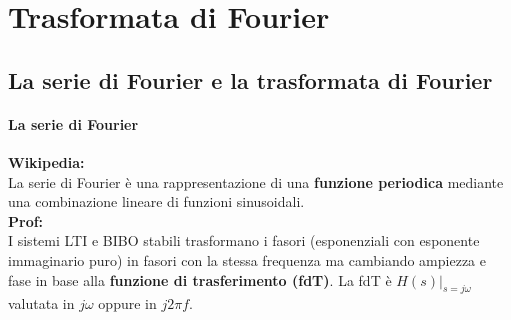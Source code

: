 \chapter{Trasformata di Fourier}

\section{La serie di Fourier e la trasformata di Fourier}

	\subsubsection{La serie di Fourier}
	\textbf{Wikipedia:}\\
	La serie di Fourier è una rappresentazione di una \textbf{funzione periodica} mediante una combinazione lineare di funzioni sinusoidali.\\
	\textbf{Prof:}\\
	I sistemi LTI e BIBO stabili trasformano i fasori (esponenziali con esponente immaginario puro) in fasori con la stessa frequenza ma cambiando ampiezza e fase in base alla \textbf{funzione di trasferimento (fdT)}.
	La fdT è $ H(s) |_{s=j \omega}$ valutata in $ j \omega $ oppure in $ j 2 \pi f$.\\
